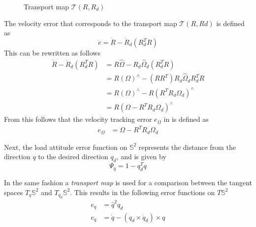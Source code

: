 \begin{figure}[h!]
	\centering
	\caption{Transport map $ \mathcal{T}(R,R_d) $\label{fig:con.transport}}
\end{figure}		

The velocity error that corresponds to the transport map $ \mathcal{T}(R,Rd)$ is defined as
\begin{equation}\label{key}
\dot{e}=\dot{R}-\dot{R}_d(R_d^TR)
\end{equation}
This can be rewritten as follows
\begin{equation}\label{key}
\begin{aligned}
\dot{R}-\dot{R}_d(R_d^TR) &=R\hat{\Omega}-R_d\hat{\Omega}_d(R_d^TR) \\
&=R(\Omega)^\wedge-(RR^T)R_d\hat{\Omega}_dR_d^TR\\
&=R(\Omega)^\wedge-R(R^TR_d{\Omega}_d)^\wedge \\
&=R(\Omega-R^TR_d{\Omega}_d)^\wedge 
\end{aligned}
\end{equation}
From this follows that the velocity tracking error $ e_{\Omega} $ in \BF  is defined as
\begin{align}\label{eq:con.eOmega}
e_\Omega&=\Omega- R^TR_d\Omega_d
\end{align}

Next, the load attitude error function 
on $ \mathbb{S}^2 $ represents the distance from the direction $ q $ to the desired direction $ q_d $, and is given by 
\begin{equation}\label{eq:psiq}
\Psi_q=1-q_d^Tq
\end{equation}

In the same fashion a \textit{transport map} is used for a comparison between the tangent spaces $ T_q\mathbb{S}^2$ and $ T_{q_d}\mathbb{S}^2$. This results in the following error functions on $ T\mathbb{S}^2 $
\begin{align}
e_q&=\hat{q}^2q_d\label{eq:con.eq}\\
e_{\dot{q}}&=\dot{q}-(q_d\times\dot{q}_d)\times q\label{eq:con.edq}
\end{align}

